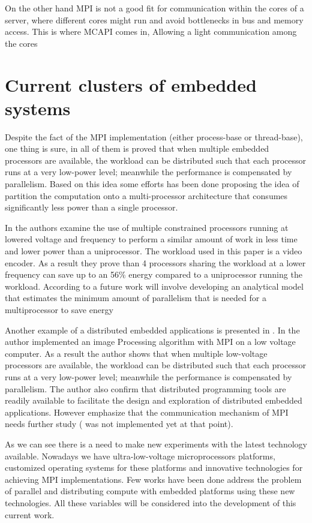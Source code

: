 On the other hand MPI is not a good fit for communication within the cores of a
server, where different cores might run and avoid bottlenecks in bus and memory
access. This is where MCAPI comes in, Allowing a light communication among the
cores 

\section{Current clusters of embedded systems}

Despite the fact of the MPI implementation (either process-base or
thread-base), one thing is sure, in all of them is proved that when multiple
embedded processors are available, the workload can be distributed such that
each processor runs at a very low-power level; meanwhile the performance is
compensated by parallelism. Based on this idea some efforts has been done
\cite{Liu} \cite{Weglarz} proposing the idea of partition the computation onto
a multi-processor architecture that consumes significantly less power than a
single processor.

In \cite{Weglarz} the authors examine the use of multiple constrained
processors running at lowered voltage and frequency to perform a similar amount
of work in less time and lower power than a uniprocessor.  The workload used in
this paper is a video encoder. As a result they prove than 4 processors sharing
the workload at a lower frequency can save up to an 56\% energy compared to a
uniprocessor running the workload. According to \cite{Weglarz} a future work
will involve developing an analytical model that estimates the minimum amount
of parallelism that is needed for a multiprocessor to save energy

Another example of a distributed embedded applications is presented in
\cite{Liu}. In \cite{Liu} the author implemented an image Processing algorithm
with MPI on a low voltage computer. As a result the author shows that when
multiple low-voltage processors are available, the workload can be distributed
such that each processor runs at a very low-power level; meanwhile the
performance is compensated by parallelism. The author also confirm that
distributed programming tools are readily available to facilitate the design
and exploration of distributed embedded applications. However emphasize that
the communication mechanism of MPI needs further study ( \cite{Abgaria} was not
implemented yet at that point). 

As we can see there is a need to make new experiments with the latest
technology available. Nowadays we have ultra-low-voltage microprocessors
platforms, customized operating systems for these platforms and  innovative
technologies for achieving MPI implementations. Few works \cite{Victor-Marcos}
\cite{Victor-Marcos-elc} have been done address the problem of parallel and
distributing compute with embedded platforms using these new technologies. All
these variables will be considered into the development of this current work.

\newpage

\clearpage
